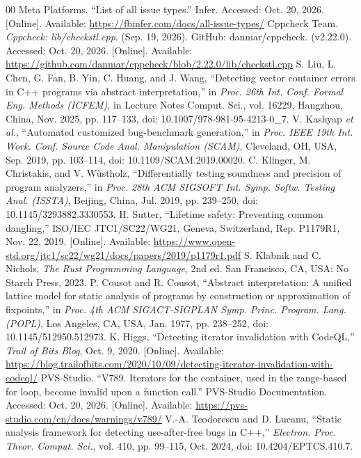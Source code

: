 \documentclass[conference]{IEEEtran}
\begin{document}
\begin{thebibliography}{00}
 Meta Platforms. ``List of all issue types.'' Infer. Accessed: Oct. 20, 2026. [Online]. Available: \url{https://fbinfer.com/docs/all-issue-types/}
 Cppcheck Team. \textit{Cppcheck: lib/checkstl.cpp}. (Sep. 19, 2026). GitHub: danmar/cppcheck. (v2.22.0). Accessed: Oct. 20, 2026. [Online]. Available: \url{https://github.com/danmar/cppcheck/blob/2.22.0/lib/checkstl.cpp}
 S. Liu, L. Chen, G. Fan, B. Yin, C. Huang, and J. Wang, ``Detecting vector container errors in C++ programs via abstract interpretation,'' in \textit{Proc. 26th Int. Conf. Formal Eng. Methods (ICFEM)}, in Lecture Notes Comput. Sci., vol. 16229, Hangzhou, China, Nov. 2025, pp. 117--133, doi: 10.1007/978-981-95-4213-0\_7.
 V. Kashyap \textit{et al.}, ``Automated customized bug-benchmark generation,'' in \textit{Proc. IEEE 19th Int. Work. Conf. Source Code Anal. Manipulation (SCAM)}, Cleveland, OH, USA, Sep. 2019, pp. 103--114, doi: 10.1109/SCAM.2019.00020.
 C. Klinger, M. Christakis, and V. W\"{u}stholz, ``Differentially testing soundness and precision of program analyzers,'' in \textit{Proc. 28th ACM SIGSOFT Int. Symp. Softw. Testing Anal. (ISSTA)}, Beijing, China, Jul. 2019, pp. 239--250, doi: 10.1145/3293882.3330553.
 H. Sutter, ``Lifetime safety: Preventing common dangling,'' ISO/IEC JTC1/SC22/WG21, Geneva, Switzerland, Rep. P1179R1, Nov. 22, 2019. [Online]. Available: \url{https://www.open-std.org/jtc1/sc22/wg21/docs/papers/2019/p1179r1.pdf}
 S. Klabnik and C. Nichols, \textit{The Rust Programming Language}, 2nd ed. San Francisco, CA, USA: No Starch Press, 2023.
 P. Cousot and R. Cousot, ``Abstract interpretation: A unified lattice model for static analysis of programs by construction or approximation of fixpoints,'' in \textit{Proc. 4th ACM SIGACT-SIGPLAN Symp. Princ. Program. Lang. (POPL)}, Los Angeles, CA, USA, Jan. 1977, pp. 238--252, doi: 10.1145/512950.512973.
 K. Higgs, ``Detecting iterator invalidation with CodeQL,'' \textit{Trail of Bits Blog}, Oct. 9, 2020. [Online]. Available: \url{https://blog.trailofbits.com/2020/10/09/detecting-iterator-invalidation-with-codeql/}
 PVS-Studio. ``V789. Iterators for the container, used in the range-based for loop, become invalid upon a function call.'' PVS-Studio Documentation. Accessed: Oct. 20, 2026. [Online]. Available: \url{https://pvs-studio.com/en/docs/warnings/v789/}
 V.-A. Teodorescu and D. Lucanu, ``Static analysis framework for detecting use-after-free bugs in C++,'' \textit{Electron. Proc. Theor. Comput. Sci.}, vol. 410, pp. 99--115, Oct. 2024, doi: 10.4204/EPTCS.410.7.

\end{thebibliography}
\end{document}
